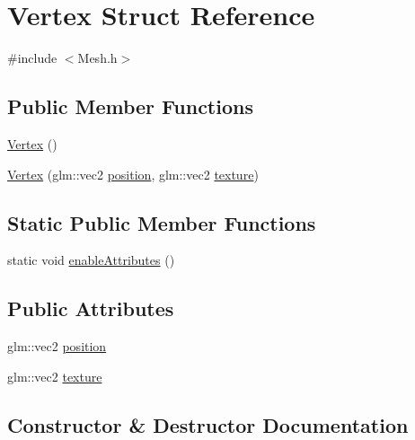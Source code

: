 \hypertarget{struct_vertex}{}\section{Vertex Struct Reference}
\label{struct_vertex}


{\ttfamily \#include $<$Mesh.\+h$>$}

\subsection*{Public Member Functions}
\begin{DoxyCompactItemize}
\item 
\hyperlink{struct_vertex_a97488994a2482d70da74e1b91d40e169}{Vertex} ()
\item 
\hyperlink{struct_vertex_a4ece5be7303fde1e77f2330250aeb2b4}{Vertex} (glm\+::vec2 \hyperlink{struct_vertex_a5efee132fdc7e4f47cba4dc51713d12a}{position}, glm\+::vec2 \hyperlink{struct_vertex_ad5205b18f6136bb5df01082f5d509be1}{texture})
\end{DoxyCompactItemize}
\subsection*{Static Public Member Functions}
\begin{DoxyCompactItemize}
\item 
static void \hyperlink{struct_vertex_a537a49ecadd79e80bc6d2715c7dd2d0f}{enable\+Attributes} ()
\end{DoxyCompactItemize}
\subsection*{Public Attributes}
\begin{DoxyCompactItemize}
\item 
glm\+::vec2 \hyperlink{struct_vertex_a5efee132fdc7e4f47cba4dc51713d12a}{position}
\item 
glm\+::vec2 \hyperlink{struct_vertex_ad5205b18f6136bb5df01082f5d509be1}{texture}
\end{DoxyCompactItemize}


\subsection{Constructor \& Destructor Documentation}
\mbox{\label{struct_vertex_a97488994a2482d70da74e1b91d40e169}} 
